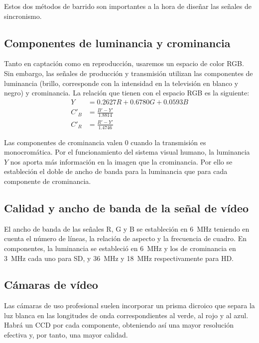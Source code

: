\documentclass[10pt]{book}
\begin{document}
Estos dos métodos de barrido son importantes a la hora de diseñar las señales de sincronismo.

\subsection{Componentes de luminancia y crominancia}

Tanto en captación como en reproducción, usaremos un espacio de color RGB. Sin embargo, las señales de producción y transmisión utilizan las componentes de luminancia (brillo, corresponde con la intensidad en la televisión en blanco y negro) y crominancia. La relación que tienen con el espacio RGB es la siguiente:
\begin{align*}
  Y    & = 0.2627R + 0.6780G + 0.0593B \\
  C'_B & = \frac{B'-Y'}{1.8814}        \\
  C'_R & = \frac{R'-Y'}{1.4746}
\end{align*}

Las componentes de crominancia valen 0 cuando la transmisión es monocromática. Por el funcionamiento del sistema visual humano, la luminancia $Y$ nos aporta más información en la imagen que la crominancia. Por ello se estableción el doble de ancho de banda para la luminancia que para cada componente de crominancia.

\subsection{Calidad y ancho de banda de la señal de vídeo}

El ancho de banda de las señales R, G y B se estableción en \SI{6}{\mega\hertz} teniendo en cuenta el número de líneas, la relación de aspecto y la frecuencia de cuadro. En componentes, la luminancia se estableció en \SI{6}{\mega\hertz} y los de crominancia en \SI{3}{\mega\hertz} cada uno para SD, y \SI{36}{\mega\hertz} y \SI{18}{\mega\hertz} respectivamente para HD.

\subsection{Cámaras de vídeo}

Las cámaras de uso profesional suelen incorporar un prisma dicroico que separa la luz blanca en las longitudes de onda correspondientes al verde, al rojo y al azul. Habrá un CCD por cada componente, obteniendo así una mayor resolución efectiva y, por tanto, una mayor calidad.
\end{document}
